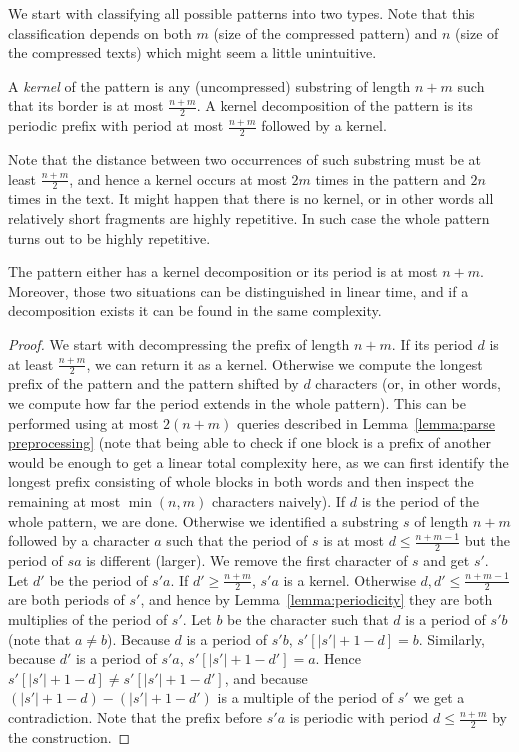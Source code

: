 \documentclass[runningheads]{llncs}
\begin{document}
We start with classifying all possible patterns into two types. Note that this classification depends on both $m$ (size of the compressed pattern) and $n$ (size of the compressed texts) which might seem a little unintuitive.

\begin{definition}
A \emph{kernel} of the pattern is any (uncompressed) substring of length $n+m$ such that its border is at most $\frac{n+m}{2}$. A kernel decomposition of the pattern is its periodic prefix with period at most $\frac{n+m}{2}$ followed by a kernel.
\end{definition}

Note that the distance between two occurrences of such substring must be at least $\frac{n+m}{2}$, and hence a kernel occurs at most $2m$ times in the pattern and $2n$ times in the text. It might happen that there is no kernel, or in other words all relatively short fragments are highly repetitive. In such case the whole pattern turns out to be highly repetitive.

\begin{lemma}
\label{lemma:kernel}
The pattern either has a kernel decomposition or its period is at most $n+m$. Moreover, those two situations can be distinguished in linear time, and if a decomposition exists it can be found in the same complexity.
\end{lemma}

\begin{proof}
We start with decompressing the prefix of length $n+m$. If its period $d$ is at least $\frac{n+m}{2}$, we can return it as a kernel. Otherwise we
compute the longest prefix of the pattern and the pattern shifted by $d$ characters (or, in other words, we compute how far the period extends
in the whole pattern). This can be performed using at most $2(n+m)$ queries described in Lemma~\ref{lemma:parse preprocessing} (note that being able to check if one block is a prefix of another would be enough to get a linear total complexity here, as we can first identify the longest prefix consisting of whole blocks in both words and then inspect the remaining at most $\min(n,m)$ characters naively). If $d$ is the period
of the whole pattern, we are done. Otherwise we identified a substring $s$ of length $n+m$ followed by a character $a$ such that the period of
$s$ is at most $d\leq\frac{n+m-1}{2}$ but the period of $sa$ is different (larger). We remove the first character of $s$ and get $s'$. Let $d'$ be
the period of $s'a$. If $d'\geq\frac{n+m}{2}$, $s'a$ is a kernel. Otherwise $d,d'\leq\frac{n+m-1}{2}$ are both periods of $s'$, and hence by 
Lemma~\ref{lemma:periodicity} they are both multiplies of the period of $s'$. Let $b$ be the character such that $d$ is a period of $s'b$ (note that $a\neq b$). Because $d$ is a period of $s'b$, $s'[|s'|+1-d]=b$. Similarly, because $d'$ is a period of $s'a$, $s'[|s'|+1-d']=a$. Hence $s'[|s'|+1-d]\neq s'[|s'|+1-d']$, and because $(|s'|+1-d)-(|s'|+1-d')$ is a multiple of the period of $s'$ we get a contradiction. Note that the prefix before $s'a$ is periodic with period $d\leq\frac{n+m}{2}$ by the construction.
\end{proof}
\end{document}
